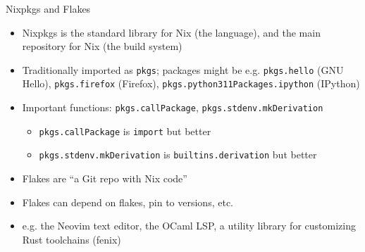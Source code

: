 \documentclass[aspectratio=169, notes]{beamer}
\begin{document}
\begin{frame}{Nixpkgs and Flakes}
	\begin{itemize}
		\item Nixpkgs is the standard library for Nix (the language), and the main repository for Nix (the build system)
		\item Traditionally imported as \texttt{pkgs}; packages might be e.g. \texttt{pkgs.hello} (GNU Hello), \texttt{pkgs.firefox} (Firefox), \texttt{pkgs.python311Packages.ipython} (IPython)
		\item Important functions: \texttt{pkgs.callPackage}, \texttt{pkgs.stdenv.mkDerivation}
		      \begin{itemize}
			      \item \texttt{pkgs.callPackage} is \texttt{import} but better
			      \item \texttt{pkgs.stdenv.mkDerivation} is \texttt{builtins.derivation} but better
		      \end{itemize}
		      \vspace{1cm}
		\item Flakes are ``a Git repo with Nix code''
		\item Flakes can depend on flakes, pin to versions, etc.
		\item e.g. the Neovim text editor, the OCaml LSP, a utility library for customizing Rust toolchains (fenix)
	\end{itemize}
\end{frame}
\end{document}
